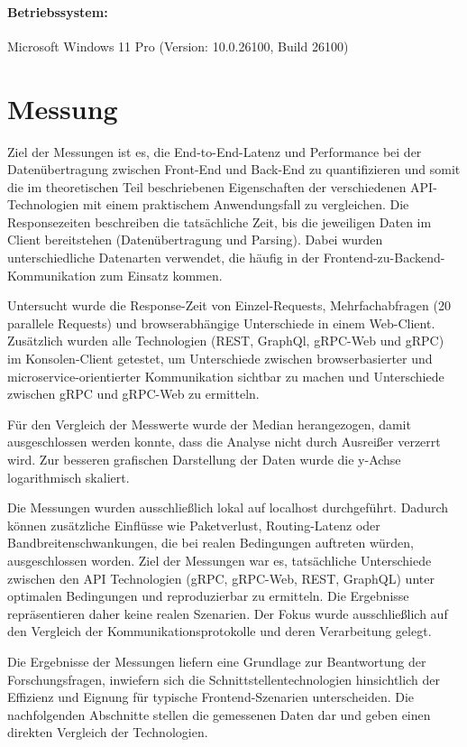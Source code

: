 \paragraph{Betriebssystem:}
Microsoft Windows 11 Pro (Version: 10.0.26100, Build 26100)

\clearpage
\section{Messung}
Ziel der Messungen ist es, die End-to-End-Latenz und Performance bei der Datenübertragung zwischen Front-End und Back-End zu quantifizieren und somit die im theoretischen Teil beschriebenen Eigenschaften der verschiedenen API-Technologien mit einem praktischem Anwendungsfall zu vergleichen.  
Die Responsezeiten beschreiben die tatsächliche Zeit, bis die jeweiligen Daten im Client bereitstehen (Datenübertragung und Parsing). Dabei wurden unterschiedliche Datenarten verwendet, die häufig in der Frontend-zu-Backend-Kommunikation zum Einsatz kommen.  

Untersucht wurde die Response-Zeit von Einzel-Requests, Mehrfachabfragen (20 parallele Requests) und browserabhängige Unterschiede in einem Web-Client. Zusätzlich wurden alle Technologien (REST, GraphQl, gRPC-Web und gRPC) im Konsolen-Client getestet, um Unterschiede zwischen browserbasierter und microservice-orientierter Kommunikation sichtbar zu machen und Unterschiede zwischen gRPC und gRPC-Web zu ermitteln.

Für den Vergleich der Messwerte wurde der Median herangezogen, damit ausgeschlossen werden konnte, dass die Analyse nicht durch Ausreißer verzerrt wird. Zur besseren grafischen Darstellung der Daten wurde die y-Achse logarithmisch skaliert.

Die Messungen wurden ausschließlich lokal auf localhost durchgeführt. Dadurch können zusätzliche Einflüsse wie Paketverlust, Routing-Latenz oder Bandbreitenschwankungen, die bei realen Bedingungen auftreten würden, ausgeschlossen worden. Ziel der Messungen war es, tatsächliche Unterschiede zwischen den API Technologien (gRPC, gRPC-Web, REST, GraphQL) unter optimalen Bedingungen und reproduzierbar zu ermitteln.
Die Ergebnisse repräsentieren daher keine realen Szenarien. Der Fokus wurde ausschließlich auf den Vergleich der Kommunikationsprotokolle und deren Verarbeitung gelegt.

Die Ergebnisse der Messungen liefern eine Grundlage zur Beantwortung der Forschungsfragen, inwiefern sich die Schnittstellentechnologien hinsichtlich der Effizienz und Eignung für typische Frontend-Szenarien unterscheiden.  
Die nachfolgenden Abschnitte stellen die gemessenen Daten dar und geben einen direkten Vergleich der Technologien.

